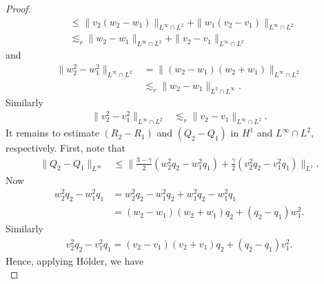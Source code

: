 \documentclass[12pt,reqno]{amsart}
\numberwithin{equation}{section}  %
\numberwithin{figure}{section}
\begin{document}
\begin{proof}
\begin{equation}
\begin{split}
  & \le \| v_{2}(w_{2} - w_{1}) \|_{L^{\infty} \cap L^{2}}  
  + \| w_{1}(v_{2} - v_{1}) \|_{L^{\infty} \cap L^{2}}  
  \\
  & \lesssim_{r} \| w_{2} - w_{1} \|_{L^{\infty} \cap L^{2}} +
  \| v_{2} - v_{1} \|_{L^{\infty} \cap L^{2}}
\end{split}
\end{equation}
%
%
and
%
\begin{equation}
  \label{2aa}
\begin{split}
  \| w^{2}_{2} - w_{1}^{2} \|_{L^{\infty} \cap L^{2}} 
  & = \| (w_{2} - w_{1})(w_{2} + w_{1}) \|_{L^{\infty} \cap L^{2}}
    \\
    & \lesssim_{r} \| w_{2} - w_{1} \|_{L^{2} \cap L^{\infty}}.
\end{split}
\end{equation}
%
Similarly
%
%
\begin{equation}
  \label{3aa}
\begin{split}
\| v^{2}_{2} - v_{1}^{2} \|_{L^{\infty} \cap L^{2}} 
& \lesssim_{r}\| v_{2} - v_{1} \|_{L^{\infty} \cap L^{2}}.
\end{split}
\end{equation}
%
%
It remains to estimate $(R_{2} - R_{1})$ and $(Q_{2} - Q_{1})$ in $H^{1}$
and $L^{\infty} \cap L^{2}$, respectively. First, note that
%
%
\begin{equation}
\begin{split}
  \| Q_{2} - Q_{1} \|_{L^{\infty}}
  & \le \| \frac{3 - \gamma}{2} (w_{2}^{2} q_{2} - w_{1}^{2} q_{1}) +
  \frac{\gamma}{2}(v_{2}^{2}q_{2} - v_{1}^{2}q_{1}) \|_{L^{1}}.
\end{split}
\end{equation}
%
%
Now
%
%
\begin{equation*}
\begin{split}
  w_{2}^{2} q_{2} - w_{1}^{2} q_{1}
  & = w_{2}^{2} q_{2} - w_{1}^{2} q_{2} + w_{1}^{2} q_{2} - w_{1}^{2} q_{1}
  \\
  & = (w_{2} - w_{1})(w_{2} + w_{1})q_{2} + (q_{2} - q_{1})w_{1}^{2}.
\end{split}
\end{equation*}
%
%
Similarly
%
%
\begin{equation*}
\begin{split}
  v_{2}^{2}q_{2} - v_{1}^{2} q_{1} = (v_{2} - v_{1})(v_{2}  + v_{1})q_{2} + (q_{2} - q_{1})v_{1}^{2}.
\end{split}
\end{equation*}
%
%
Hence, applying H\'older, we have 
\begin{equation}

\end{equation}
\end{proof}
\end{document}
